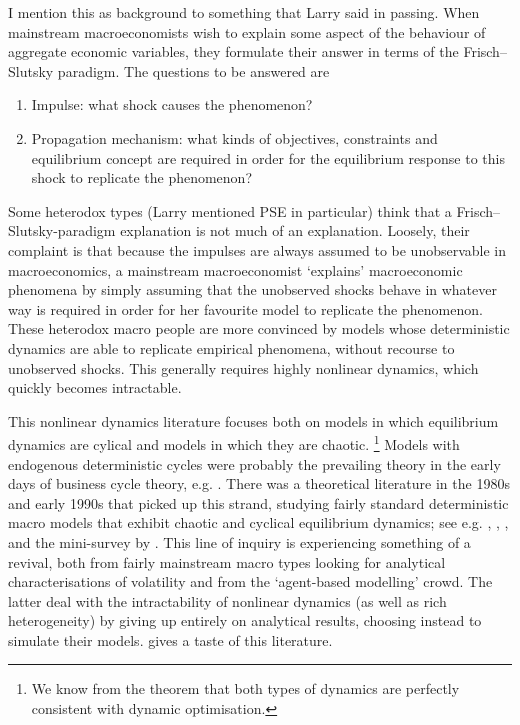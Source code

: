 \documentclass[11pt,letterpaper,reqno,oneside]{article}
\begin{document}
I mention this as background to something that Larry said in passing. When mainstream macroeconomists wish to explain some aspect of the behaviour of aggregate economic variables, they formulate their answer in terms of the Frisch--Slutsky paradigm. The questions to be answered are
%
\begin{enumerate}
	
	\item Impulse: what shock causes the phenomenon?

	\item Propagation mechanism: what kinds of objectives, constraints and equilibrium concept are required in order for the equilibrium response to this shock to replicate the phenomenon?

\end{enumerate}
%
Some heterodox types (Larry mentioned PSE in particular) think that a Frisch--Slutsky-paradigm explanation is not much of an explanation. Loosely, their complaint is that because the impulses are always assumed to be unobservable in macroeconomics, a mainstream macroeconomist `explains' macroeconomic phenomena by simply assuming that the unobserved shocks behave in whatever way is required in order for her favourite model to replicate the phenomenon. These heterodox macro people are more convinced by models whose deterministic dynamics are able to replicate empirical phenomena, without recourse to unobserved shocks. This generally requires highly nonlinear dynamics, which quickly becomes intractable.


This nonlinear dynamics literature focuses both on models in which equilibrium dynamics are cylical and models in which they are chaotic.%
	\footnote{We know from the \textcite{BoldrinMontrucchio1986} theorem that both types of dynamics are perfectly consistent with dynamic optimisation.}
Models with endogenous deterministic cycles were probably the prevailing theory in the early days of business cycle theory, e.g. \textcite{Pigou1927}. There was a theoretical literature in the 1980s and early 1990s that picked up this strand, studying fairly standard deterministic macro models that exhibit chaotic and cyclical equilibrium dynamics; see e.g. \textcite{BenhabibDay1982}, \textcite{Grandmont1985}, \textcite{BakEtAl1993}, \textcite{Matsuyama1999} and the mini-survey by \textcite{Benhabib2008}. This line of inquiry is experiencing something of a revival, both from fairly mainstream macro types looking for analytical characterisations of volatility \parencite{Lao2015,BeaudryGaliziaPortier2015} and from the `agent-based modelling' crowd. The latter deal with the intractability of nonlinear dynamics (as well as rich heterogeneity) by giving up entirely on analytical results, choosing instead to simulate their models. \textcite{GeanakoplosEtAl2012} gives a taste of this literature.
\end{document}
